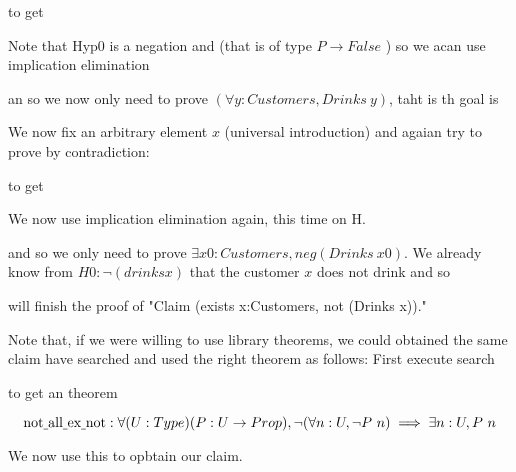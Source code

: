 to get 


Note that Hyp0 is a negation and (that is of type $P\rightarrow False$ ) so we acan use implication elimination

an so we now only need to prove $(\forall y : Customers, Drinks\ y)$, taht is th goal is
 
 We now fix an arbitrary element $x$ (universal introduction) and agaian try to prove by contradiction:
 

to get 



We now use implication elimination again, this time on H.


and so we only need to prove $\exists x0 : Customers, neg (Drinks \ x0)$. We already know from $H0:\neg(drinks x)$ that the customer $x$ does not drink and so

will finish the proof of "Claim (exists x:Customers, not (Drinks x))."


Note that, if we were willing to use library theorems, we could obtained the same claim have searched and used  the right theorem as follows:
First execute search



to get an theorem

$$\text{not\underline{ }all\underline{ }ex\underline{ }not}:
  \forall (U : Type) (P : U \rightarrow Prop), \neg (\forall n : U, \neg P\  n) \implies \exists n : U, P \ n$$

We now use this to opbtain our claim.


